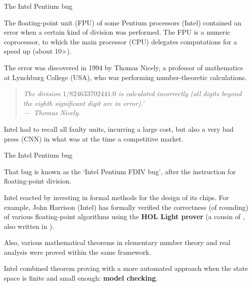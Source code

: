 \documentclass[compress,dvipdfmx]{beamer}
\begin{document}
\begin{frame}{The Intel Pentium bug}

  The floating-point unit (FPU) of some Pentium processors (Intel)
  contained an error when a certain kind of division was
  performed. The FPU is a numeric coprocessor, to which the main
  processor (CPU) delegates computations for a speed up (about
  10$\times$).

  \bigskip

  The error was discovered in 1994 by Thomas Nicely, a professor of
  mathematics at Lynchburg College (USA), who was performing
  number\hyp{}theoretic calculations.

  \medskip

  \begin{quote}
    \it The division \(1/824633702441.0\) is calculated incorrectly
    (all digits beyond the eighth significant digit are in error).'
    \\ \hfill ---~Thomas Nicely.
  \end{quote}
  Intel had to recall all faulty units, incurring a large cost, but
  also a very bad press (CNN) in what was at the time a competitive
  market.

\end{frame}


\begin{frame}{The Intel Pentium bug}

  That bug is known as the `Intel Pentium FDIV bug', after the
  instruction for floating\hyp{}point division.

  \bigskip

  Intel reacted by investing in formal methods for the design of its
  chips. For example, John Harrison (Intel) has formally verified the
  correctness (of rounding) of various floating\hyp{}point algorithms
  using the \textbf{HOL Light prover} (a cousin of \Coq, also written
  in \OCaml).

  \bigskip

  Also, various mathematical theorems in elementary number theory and
  real analysis were proved within the same framework.

  \bigskip

  Intel combined theorem proving with a more automated approach when
  the state space is finite and small enough: \textbf{model checking}.

\end{frame}
\end{document}
